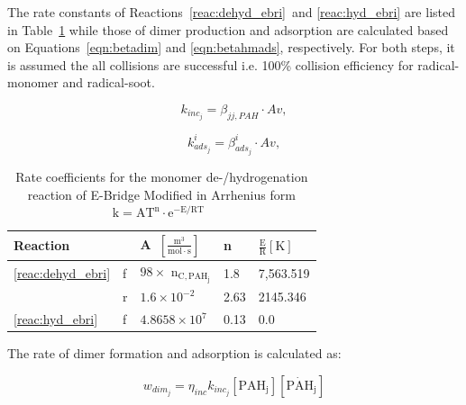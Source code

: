


The rate constants of Reactions~\eqref{reac:dehyd_ebri}\ and \eqref{reac:hyd_ebri} are listed in Table~\ref{tab:E-Bridge} while those of dimer production and adsorption are calculated based on Equations~\eqref{eqn:betadim} and \eqref{eqn:betahmads}, respectively. For both steps, it is assumed the all collisions are successful i.e. 100\% collision efficiency for radical-monomer and radical-soot.

\begin{equation}
	k_{inc_j}=
	\beta_{jj,PAH}\cdot Av
	\label{eqn:kdim_ebri},
\end{equation}

\begin{equation}
	k^i_{ads_{j}}=
	\beta^i_{ads_j}\cdot Av
	\label{eqn:kads_ebir},
\end{equation}

\begin{table}
	\caption{Rate coefficients for the monomer de-/hydrogenation reaction of E-Bridge Modified in Arrhenius form $\mathrm{k=AT^n\cdot e^{-E/RT}}$~\citep{frenklach2020mechanism}}
	\label{tab:E-Bridge}
	\centering
	\begin{tabular}{l l l l l}
		\hline
		Reaction & \hspace{0.1cm} & A~$\mathrm{\left[ \frac{m^3}{mol\cdot s} \right]}$ & n & $\mathrm{\frac{E}{R} [K]}$  \\
		\hline
		\eqref{reac:dehyd_ebri} & f & $98\times$ $\mathrm{n_{C, PAH_j}}$ & 1.8 & 7,563.519 \\
		& r & $1.6\times 10^{-2}$ & 2.63 & 2145.346\\
		\eqref{reac:hyd_ebri} & f & $4.8658\times10^7
		$ & 0.13 & 0.0\\
		\hline
	\end{tabular}
\end{table}

The rate of dimer formation and adsorption is calculated as:

\begin{equation}
	w_{dim_j} = \eta_{inc} k_{inc_{j}} [\mathrm{PAH_j}] [\mathrm{\dot{PAH}_j}]
	\label{eqn:wdim_ebri}
\end{equation}

